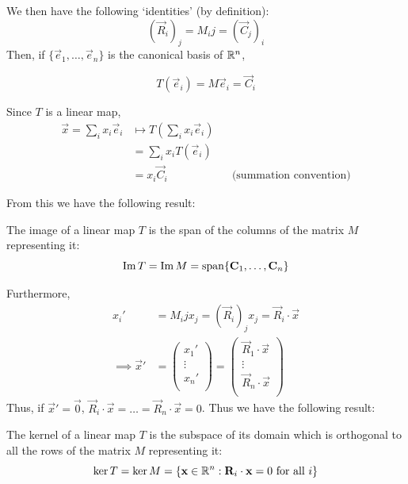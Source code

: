 \documentclass{../../template/note}
\begin{document}

    We then have the following `identities' (by definition):
    \[
        (\vec R_i)_j = M_ij = (\vec C_j)_i
    \]
    Then, if \(\{\vec e_1, \dots, \vec e_n\}\) is the canonical basis of \(\mathbb R^n\),

    \[
        T(\vec e_i) = M \vec e_i = \vec C_i
    \]

    Since \(T\) is a linear map,
    \begin{align*}
        \vec x = \sum_i x_i \vec e_i &\mapsto T\left(\sum_i x_i \vec e_i\right) \\
        &= \sum_i x_i T(\vec e_i) \\
        &= x_i \vec C_i && \text{(summation convention)}
    \end{align*}
    
    From this we have the following result:

    \begin{proposition}
        The image of a linear map \(T\) is the span of the columns of the matrix \(M\) representing it:
        \[
            \Im T = \Im M = \Span\{\vec C_1, \dots, \vec C_n\}
        \]
    \end{proposition}
    
    Furthermore,
    \begin{align*}
        x_i' &= M_ij x_j = (\vec R_i)_j x_j = \vec R_i \cdot \vec x \\
        \implies \vec x' &= \begin{pmatrix}
         x_1' \\
         \vdots \\
         x_n' \\
        \end{pmatrix} = \begin{pmatrix}
         \vec R_1 \cdot \vec x \\
         \vdots \\
         \vec R_n \cdot \vec x \\
        \end{pmatrix}
    \end{align*}
    Thus, if \(\vec x' = \vec 0\), \(\vec R_i \cdot \vec x = \dots = \vec R_n \cdot \vec x = 0\). Thus we have the following result:

    \begin{proposition}
        The kernel of a linear map \(T\) is the subspace of its domain which is orthogonal to all the rows of the matrix \(M\) representing it:
        \[
            \ker T = \ker M = \{\vec x \in \RR^n: \vec R_i \cdot \vec x = 0 \text{ for all }i\}
        \]
    \end{proposition}
    
\end{document}
